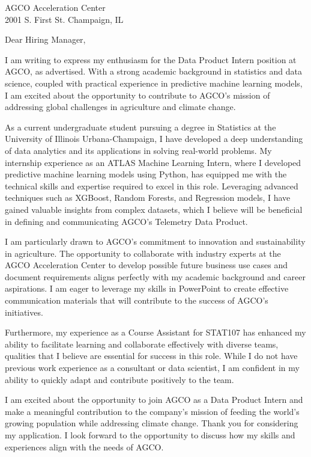 \documentclass{letter}
\begin{document}
\begin{letter}{
AGCO Acceleration Center\\
2001 S. First St. Champaign, IL}


\opening{Dear Hiring Manager,}


I am writing to express my enthusiasm for the Data Product Intern position at 
AGCO, as advertised. With a strong academic background in statistics 
and data science, coupled with practical experience in predictive machine 
learning models, I am excited about the opportunity to contribute to AGCO's 
mission of addressing global challenges in agriculture and climate change.

As a current undergraduate student pursuing a degree in Statistics at the 
University of Illinois Urbana-Champaign, I have developed a deep understanding 
of data analytics and its applications in solving real-world problems. 
My internship experience as an ATLAS Machine Learning Intern, where I 
developed predictive machine learning models using Python, has equipped 
me with the technical skills and expertise required to excel in this role. 
Leveraging advanced techniques such as XGBoost, Random Forests, and Regression
 models, I have gained valuable insights from complex datasets, which I believe
  will be beneficial in defining and communicating AGCO's Telemetry Data Product.

I am particularly drawn to AGCO's commitment to innovation and sustainability 
in agriculture. The opportunity to collaborate with industry experts at the 
AGCO Acceleration Center to develop possible future business use cases and 
document requirements aligns perfectly with my academic background and 
career aspirations. I am eager to leverage my skills in PowerPoint 
to create effective communication materials that will contribute to 
the success of AGCO's initiatives.

Furthermore, my experience as a Course Assistant for STAT107 
has enhanced my ability to facilitate learning and collaborate 
effectively with diverse teams, qualities that I believe are 
essential for success in this role. While I do not have previous
 work experience as a consultant or data scientist, I am confident 
 in my ability to quickly adapt and contribute positively to the team.

I am excited about the opportunity to join AGCO as a Data Product 
Intern and make a meaningful contribution to the company's mission
 of feeding the world's growing population while addressing climate 
 change. Thank you for considering my application. I look forward to 
 the opportunity to discuss how my skills and experiences align with 
 the needs of AGCO.


\end{letter}
\end{document}
